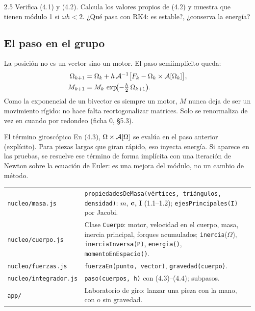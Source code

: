 \documentclass[11pt,a4paper]{article}
\begin{document}
\begin{ejercicio}{2.5}
Verifica (4.1) y (4.2). Calcula los valores propios de (4.2) y muestra que tienen módulo 1 si $\omega h < 2$. ¿Qué pasa
con RK4: es estable?, ¿conserva la energía?
\end{ejercicio}

\subsection{El paso en el grupo}
La posición no es un vector sino un motor. El paso semiimplícito queda:
\begin{align}
  \Omega_{k+1} &= \Omega_k + h\,\mathcal{A}^{-1}\bigl[F_k - \Omega_k\times\mathcal{A}[\Omega_k]\bigr],\\
  M_{k+1} &= M_k\,\exp\!\bigl(-\tfrac h2\,\Omega_{k+1}\bigr).
\end{align}
Como la exponencial de un bivector es siempre un motor, $M$ nunca deja de ser un movimiento rígido: no hace falta
reortogonalizar matrices. Solo se renormaliza de vez en cuando por redondeo (ficha 0, §5.3).

\begin{nota}{El término giroscópico}
En (4.3), $\Omega\times\mathcal{A}[\Omega]$ se evalúa en el paso anterior (explícito). Para piezas largas que giran rápido,
eso inyecta energía. Si aparece en las pruebas, se resuelve ese término de forma implícita con una iteración de
Newton sobre la ecuación de Euler: es una mejora del módulo, no un cambio de método.
\end{nota}

\begin{codigo}
\begin{tabularx}{\linewidth}{@{}l Y@{}}
\texttt{nucleo/masa.js} & \texttt{propiedadesDeMasa(vértices, triángulos, densidad)}: $m$, $\bm{c}$, $\mathbf I$
  (1.1--1.2); \texttt{ejesPrincipales(I)} por Jacobi.\\
\texttt{nucleo/cuerpo.js} & Clase \texttt{Cuerpo}: motor, velocidad en el cuerpo, masa, inercia principal, forques
  acumulados; \texttt{inercia}($\Omega$), \texttt{inerciaInversa(P)}, \texttt{energia()}, \texttt{momentoEnEspacio()}.\\
\texttt{nucleo/fuerzas.js} & \texttt{fuerzaEn(punto, vector)}, \texttt{gravedad(cuerpo)}.\\
\texttt{nucleo/integrador.js} & \texttt{paso(cuerpos, h)} con (4.3)--(4.4); subpasos.\\
\texttt{app/} & Laboratorio de giro: lanzar una pieza con la mano, con o sin gravedad.\\
\end{tabularx}
\end{codigo}
\end{document}
